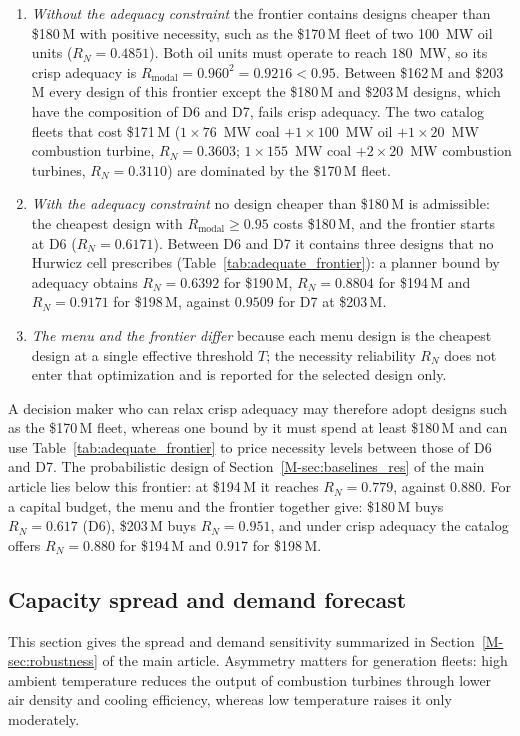 \documentclass[11pt]{article}
\begin{document}


\begin{enumerate}
\item \emph{Without the adequacy constraint} the frontier contains designs cheaper than \$180\,M with
positive necessity, such as the \$170\,M fleet of two 100~MW oil units ($R_N = 0.4851$). Both oil units
must operate to reach $180$~MW, so its crisp adequacy is $R_{\mathrm{modal}} = 0.960^2 = 0.9216 < 0.95$.
Between \$162\,M and \$203\,M every design of this frontier except the \$180\,M and \$203\,M designs, which
have the composition of D6 and D7, fails crisp adequacy. The two catalog fleets that cost \$171\,M
($1 \times 76$~MW coal $+ 1 \times 100$~MW oil $+ 1 \times 20$~MW combustion turbine, $R_N = 0.3603$; $1 \times 155$~MW coal
$+ 2 \times 20$~MW combustion turbines, $R_N = 0.3110$) are dominated by the \$170\,M fleet.
\item \emph{With the adequacy constraint} no design cheaper than \$180\,M is admissible: the cheapest design
with $R_{\mathrm{modal}} \ge 0.95$ costs \$180\,M, and the frontier starts at D6 ($R_N = 0.6171$). Between D6
and D7 it contains three designs that no Hurwicz cell prescribes (Table~\ref{tab:adequate_frontier}): a planner
bound by adequacy obtains $R_N = 0.6392$ for \$190\,M, $R_N = 0.8804$ for \$194\,M and $R_N = 0.9171$ for \$198\,M, against $0.9509$ for D7
at \$203\,M.
\item \emph{The menu and the frontier differ} because each menu design is the cheapest design at a single
effective threshold $T$; the necessity reliability $R_N$ does not enter that optimization and is reported
for the selected design only.
\end{enumerate}
A decision maker who can relax crisp adequacy may therefore adopt designs such as the \$170\,M fleet,
whereas one bound by it must spend at least \$180\,M and can use Table~\ref{tab:adequate_frontier} to price
necessity levels between those of D6 and D7. The probabilistic design of Section~\ref*{M-sec:baselines_res} of
the main article lies below this frontier: at \$194\,M it reaches $R_N=0.779$, against $0.880$. For a capital
budget, the menu and the frontier together give: \$180\,M buys $R_N = 0.617$ (D6), \$203\,M buys $R_N = 0.951$,
and under crisp adequacy the catalog offers $R_N = 0.880$ for \$194\,M and $0.917$ for \$198\,M.

\subsection{Capacity spread and demand forecast} \label{sec:supp_rts_spread}
This section gives the spread and demand sensitivity summarized in Section~\ref*{M-sec:robustness} of the main
article. Asymmetry matters for generation fleets: high ambient temperature reduces the output of combustion
turbines through lower air density and cooling efficiency, whereas low temperature raises it only moderately.
\end{document}
